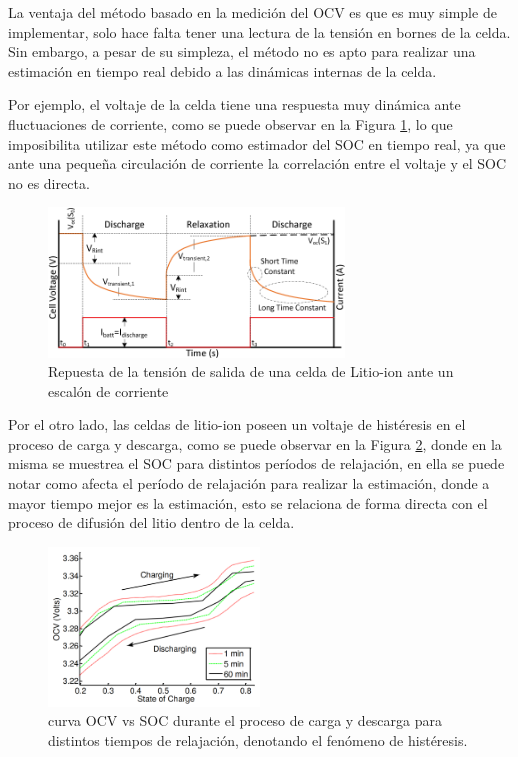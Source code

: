 \documentclass[10pt,a4paper]{article}
\begin{document}
\noindent La ventaja del m\'etodo basado en la medici\'on del \acrshort{OCV} es
que es muy simple de implementar, solo hace falta tener una lectura de la
tensi\'on en bornes de la celda. Sin embargo, a pesar de su simpleza, el
m\'etodo no es apto para realizar una estimaci\'on en tiempo real debido a las
din\'amicas internas de la celda.

\noindent Por ejemplo, el voltaje de la celda tiene una respuesta muy din\'amica
ante fluctuaciones de corriente, como se puede observar en la Figura
\ref{relaxation_ocv}, lo que imposibilita utilizar este m\'etodo como estimador
del \acrshort{SOC} en tiempo real, ya que ante una pequeña circulaci\'on de
corriente la correlaci\'on entre el voltaje y el \acrshort{SOC} no es directa.

\begin{figure}[h!]
    \begin{center}
        \includegraphics[width=0.7\textwidth]{ocv_relaxation.png}
        \caption{Repuesta de la tensi\'on de salida de una celda de Litio-ion
        ante un escal\'on de corriente}
        \label{relaxation_ocv}
    \end{center}
\end{figure}

\noindent Por el otro lado, las celdas de litio-ion poseen un voltaje de
hist\'eresis en el proceso de carga y descarga, como se puede observar en la
Figura \ref{histeresis_plot}, donde en la misma se muestrea el \acrshort{SOC}
para distintos per\'iodos de relajaci\'on, en ella se puede notar como
afecta el per\'iodo de relajaci\'on para realizar la estimaci\'on, donde a
mayor tiempo mejor es la estimaci\'on, esto se relaciona de forma directa con el
proceso de difusi\'on del litio dentro de la celda.

\begin{figure}[h!]
    \begin{center}
        \includegraphics[width=0.5\textwidth]{soc_histeresis.png}
        \caption{curva \acrshort{OCV} vs \acrshort{SOC} durante el proceso de
            carga y descarga para distintos tiempos de relajaci\'on, denotando
            el fen\'omeno de hist\'eresis.} 
        \label{histeresis_plot}
    \end{center}
\end{figure}
\end{document}
